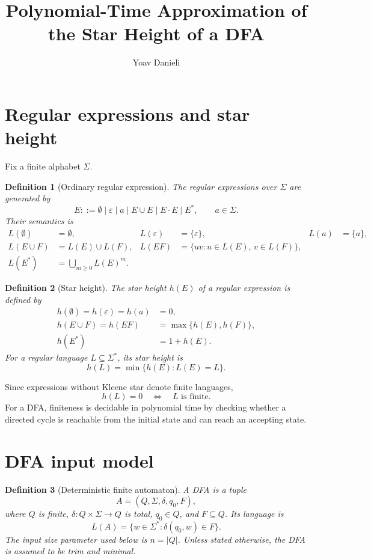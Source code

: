 \documentclass[11pt]{article}
\title{Polynomial-Time Approximation of the Star Height of a DFA}
\author{Yoav Danieli}
\date{}
\newtheorem{definition}{Definition}
\begin{document}
\maketitle

\section{Regular expressions and star height}

Fix a finite alphabet $\Sigma$.

\begin{definition}[Ordinary regular expression]
The regular expressions over $\Sigma$ are generated by
\[
 E ::= \emptyset\mid\varepsilon\mid a
 \mid E\cup E\mid E\cdot E\mid E^*,
 \qquad a\in\Sigma.
\]
Their semantics is
\[
\begin{aligned}
L(\emptyset)&=\emptyset,&
L(\varepsilon)&=\{\varepsilon\},&
L(a)&=\{a\},\\
L(E\cup F)&=L(E)\cup L(F),&
L(EF)&=\{uv:u\in L(E),\,v\in L(F)\},\\
L(E^*)&=\bigcup_{m\geq0}L(E)^m.
\end{aligned}
\]
\end{definition}

\begin{definition}[Star height]
The star height $h(E)$ of a regular expression is defined by
\[
\begin{aligned}
h(\emptyset)=h(\varepsilon)=h(a)&=0,\\
h(E\cup F)=h(EF)&=\max\{h(E),h(F)\},\\
h(E^*)&=1+h(E).
\end{aligned}
\]
For a regular language $L\subseteq\Sigma^*$, its star height is
\[
 h(L)=\min\{h(E):L(E)=L\}.
\]
\end{definition}

Since expressions without Kleene star denote finite languages,
\[
 h(L)=0 \quad\Longleftrightarrow\quad L\text{ is finite}.
\]
For a DFA, finiteness is decidable in polynomial time by checking whether a
directed cycle is reachable from the initial state and can reach an accepting
state.

\section{DFA input model}

\begin{definition}[Deterministic finite automaton]
A DFA is a tuple
\[
 A=(Q,\Sigma,\delta,q_0,F),
\]
where $Q$ is finite, $\delta:Q\times\Sigma\to Q$ is total,
$q_0\in Q$, and $F\subseteq Q$. Its language is
\[
 L(A)=\{w\in\Sigma^*:\delta(q_0,w)\in F\}.
\]
The input size parameter used below is $n=|Q|$. Unless stated otherwise, the
DFA is assumed to be trim and minimal.
\end{definition}
\end{document}
